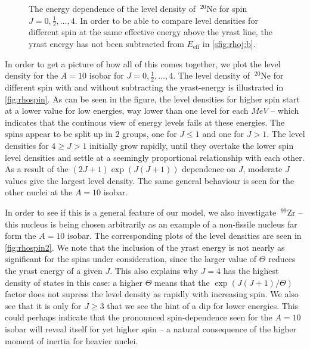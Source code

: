 \begin{figure}
\begin{center}
\begin{tabular}{cc}
\end{tabular}
\caption{\label{fig:rhospin} The energy dependence of the level density of $~^{20}\mathrm{Ne}$ for spin $J=0,\tfrac{1}{2},\dots, 4$. In order to be able to compare level densities for different spin at the same effective energy above the yrast line, the yrast energy has not been subtracted from $E_\text{eff}$ in \ref{sfig:rhoj:b}.}
\end{center}
\end{figure}

In order to get a picture of how all of this comes together, we plot the level density for the $A=10$ isobar for $J=0,\tfrac{1}{2},\dots, 4$. The level density of $~^{20}\mathrm{Ne}$ for different spin with and without subtracting the yrast-energy is illustrated in \autoref{fig:rhospin}. 
As can be seen in the figure, the level densities for higher spin start at a lower value for low energies, way lower than one level for each $\unit{MeV}$ -- which indicates that the continous view of energy levels fails at these energies. 
The spins appear to be split up in $2$ groups, one for $J \le 1$ and one for $J>1$.
The level densities for $4 \ge J> 1$ initially grow rapidly, until they overtake the lower spin level densities and settle at a seemingly proportional relationship with each other. As a result of the $(2J+1)\exp{(J(J+1))}$ dependence on $J$, moderate $J$ values give the largest level density.
The same general behaviour is seen for the other nuclei at the $A=10$ isobar.

In order to see if this is a general feature of our model, we also investigate $~^{99}\mathrm{Zr}$ -- this nucleus is being chosen arbitrarily as an example of a non-fissile nucleus far form the $A=10$ isobar. The corresponding plots of the level densities are seen in \autoref{fig:rhospin2}. We note that the inclusion of the yrast energy is not nearly as significant for the spins under consideration, since the larger value of $\Theta$ reduces the yrast energy of a given $J$. This also explains why $J=4$ has the highest density of states in this case: a higher $\Theta$ means that the $\exp{(J(J+1)/\Theta)}$ factor does not supress the level density as rapidly with increasing spin. 
We also see that it is only for $J\ge 3$ that we see the hint of a dip for lower energies. This could perhaps indicate that the pronounced spin-dependence seen for the $A=10$ isobar will reveal itself for yet higher spin -- a natural consequence of the higher moment of inertia for heavier nuclei.

